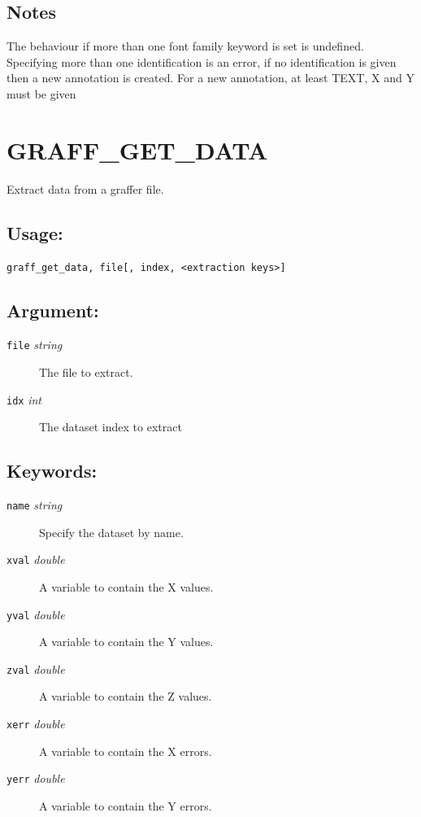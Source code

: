\documentclass[11pt,twoside,english]{article}
\begin{document}
\subsection{ Notes}
\label{sec:ga-notes}

	The behaviour if more than one font family keyword is set is
	undefined.
	Specifying more than one identification is an error, if no
	identification is given then a new annotation is created.
	For a new annotation, at least TEXT, X and Y must be given

 \section{GRAFF\_GET\_DATA}
 \label{sec:graff-get-data}

 
	Extract data from a graffer file.

 \subsection{Usage:}
 \label{sec:ggd-usage}

 
\begin{verbatim}
graff_get_data, file[, index, <extraction keys>]
\end{verbatim}

\subsection{ Argument:}
\label{sec:ggd-args}

\begin{description}
\item[\texttt{file}	\textit{string}]	The file to extract.

\item[\texttt{idx}	\textit{int}]	The dataset index to extract

\end{description}

\subsection{ Keywords:}
\label{sec:ggd-keys}

\begin{description}
\item[\texttt{name} \textit{string}] Specify the dataset by name.
\item[\texttt{xval} \textit{double}] A variable to contain the X
  values.
\item[\texttt{yval} \textit{double}] A variable to contain the Y
  values.
\item[\texttt{zval} \textit{double}] A variable to contain the Z
  values.
\item[\texttt{xerr} \textit{double}] A variable to contain the X
  errors.
\item[\texttt{yerr} \textit{double}] A variable to contain the Y
  errors.
\end{description}
\end{document}
